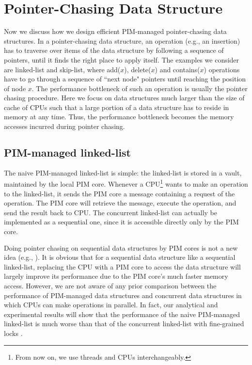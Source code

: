 
\section{Pointer-Chasing Data Structure}
\label{section:pointer_chasing}
Now we discuss how we design efficient PIM-managed pointer-chasing data structures.
In a pointer-chasing data structure, an operation (e.g., an insertion) has to traverse over 
items of the data structure by following a sequence of pointers, 
until it finds the right place to apply itself.
The examples we consider are linked-list and skip-list,
where add($x$), delete($x$) and contains($x$) operations have to go through
a sequence of ``next node" pointers until reaching the position of node $x$.
The performance bottleneck of such an operation is usually the pointer chasing procedure.
Here we focus on data structures much larger than the size of cache of CPUs
such that a large portion of a data structure has to reside in memory at any time.
Thus, the performance bottleneck becomes the memory accesses incurred during pointer chasing.


\subsection{PIM-managed linked-list}
\label{section:linked_list}
The naive PIM-managed linked-list is simple:
the linked-list is stored in a vault, maintained by the local PIM core.
Whenever a CPU\footnote{From now on, we use threads and CPUs interchangeably.} 
wants to make an operation to the linked-list,
it sends the PIM core a message containing a request of the operation. 
The PIM core will retrieve the message, execute the operation, and send the result back to CPU.
The concurrent linked-list can actually be implemented
as a sequential one, since it is accessible directly only by the PIM core.

Doing pointer chasing on sequential data structures by PIM cores is not a new idea
(e.g., \cite{hsieh2016accelerating, Ahn2015:2}).
It is obvious that for a sequential data structure like a sequential linked-list,
replacing the CPU with a PIM core to access the data structure will largely improve
its performance due to the PIM core's much faster memory access.
However, we are not aware of any prior comparison between the performance of
PIM-managed data structures and concurrent data structures
in which CPUs can make operations in parallel.
In fact, our analytical and experimental results will show that
the performance of the naive PIM-managed linked-list is much worse than
that of the concurrent linked-list with fine-grained locks \cite{Heller05}.

